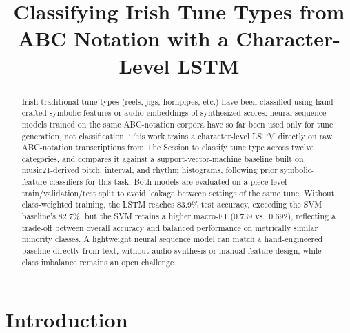 \documentclass{article}
\title{Classifying Irish Tune Types from ABC Notation with a Character-Level LSTM}
\begin{document}
\maketitle

\begin{abstract}
Irish traditional tune types (reels, jigs, hornpipes, etc.) have been classified using hand-crafted symbolic features or audio embeddings of synthesized scores; neural sequence models trained on the same ABC-notation corpora have so far been used only for tune generation, not classification. This work trains a character-level LSTM directly on raw ABC-notation transcriptions from The Session to classify tune type across twelve categories, and compares it against a support-vector-machine baseline built on music21-derived pitch, interval, and rhythm histograms, following prior symbolic-feature classifiers for this task. Both models are evaluated on a piece-level train/validation/test split to avoid leakage between settings of the same tune. Without class-weighted training, the LSTM reaches 83.9\% test accuracy, exceeding the SVM baseline's 82.7\%, but the SVM retains a higher macro-F1 (0.739 vs.\ 0.692), reflecting a trade-off between overall accuracy and balanced performance on metrically similar minority classes. A lightweight neural sequence model can match a hand-engineered baseline directly from text, without audio synthesis or manual feature design, while class imbalance remains an open challenge.
\end{abstract}

\section{Introduction}\label{sec:introduction}
\end{document}
